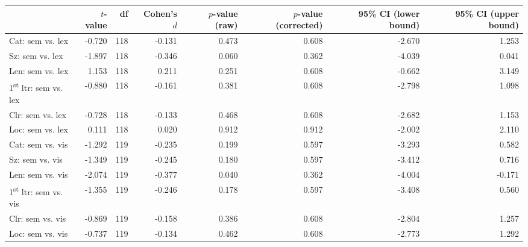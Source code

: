\begin{tabular}{lrrrrrrr}
\toprule
{} & $t$-value &  df & Cohen's $d$ & $p$-value (raw) & $p$-value (corrected) & 95\% CI (lower bound) & 95\% CI (upper bound) \\
\midrule
Cat: sem vs. lex                       &    -0.720 & 118 &      -0.131 &           0.473 &                 0.608 &                -2.670 &                 1.253 \\
Sz: sem vs. lex                        &    -1.897 & 118 &      -0.346 &           0.060 &                 0.362 &                -4.039 &                 0.041 \\
Len: sem vs. lex                       &     1.153 & 118 &       0.211 &           0.251 &                 0.608 &                -0.662 &                 3.149 \\
1\textsuperscript{st} ltr: sem vs. lex &    -0.880 & 118 &      -0.161 &           0.381 &                 0.608 &                -2.798 &                 1.098 \\
Clr: sem vs. lex                       &    -0.728 & 118 &      -0.133 &           0.468 &                 0.608 &                -2.682 &                 1.153 \\
Loc: sem vs. lex                       &     0.111 & 118 &       0.020 &           0.912 &                 0.912 &                -2.002 &                 2.110 \\
Cat: sem vs. vis                       &    -1.292 & 119 &      -0.235 &           0.199 &                 0.597 &                -3.293 &                 0.582 \\
Sz: sem vs. vis                        &    -1.349 & 119 &      -0.245 &           0.180 &                 0.597 &                -3.412 &                 0.716 \\
Len: sem vs. vis                       &    -2.074 & 119 &      -0.377 &           0.040 &                 0.362 &                -4.004 &                -0.171 \\
1\textsuperscript{st} ltr: sem vs. vis &    -1.355 & 119 &      -0.246 &           0.178 &                 0.597 &                -3.408 &                 0.560 \\
Clr: sem vs. vis                       &    -0.869 & 119 &      -0.158 &           0.386 &                 0.608 &                -2.804 &                 1.257 \\
Loc: sem vs. vis                       &    -0.737 & 119 &      -0.134 &           0.462 &                 0.608 &                -2.773 &                 1.292 \\

\end{tabular}
